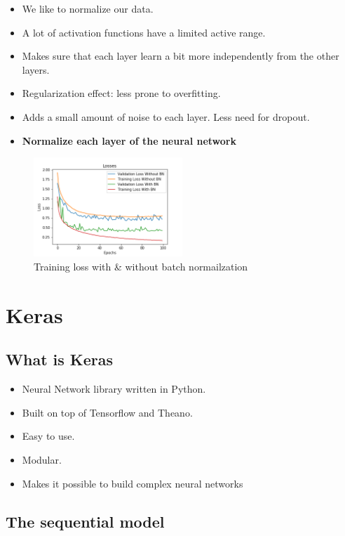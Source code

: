 \documentclass{article}
\begin{document}
\begin{itemize}
    \item We like to normalize our data.
    \item A lot of activation functions have a limited active range.
    \item Makes sure that each layer learn a bit more independently from the other layers.
    \item Regularization effect: less prone to overfitting.
    \item Adds a small amount of noise to each layer. Less need for dropout.
    \item \textbf{Normalize each layer of the neural network}
\end{itemize}

\begin{figure}[H]
    \centering
    \includegraphics[width=0.5\textwidth]{img/batch-normailzation-training-loss.png}
    \caption{Training loss with \& without batch normailzation}
\end{figure}

\section{Keras}

\subsection{What is Keras}

\begin{itemize}
    \item Neural Network library written in Python.
    \item Built on top of Tensorflow and Theano.
    \item Easy to use.
    \item Modular.
    \item Makes it possible to build complex neural networks
\end{itemize}

\subsection{The sequential model}
\end{document}
